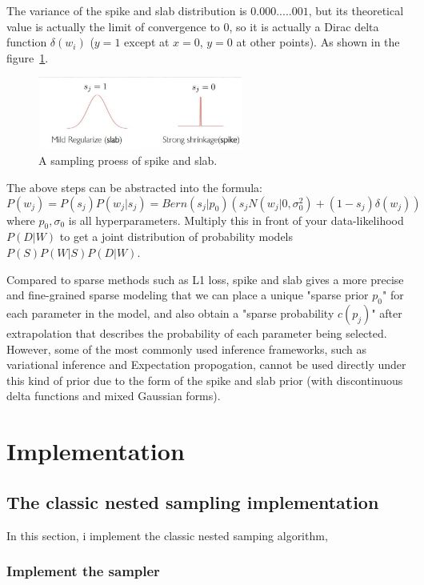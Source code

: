 \documentclass[11pt]{book}
\begin{document}
	
The variance of the spike and slab distribution is $0.000.... .001$, 
but its theoretical value is actually the limit of convergence to 0, 
so it is actually a Dirac delta function $\delta(w_i)$ ($y=1$ except at $x=0$, $y=0$ at other points).
As shown in the figure~\ref{fig:spike-slab-sampling}.
\begin{center}
	\begin{figure}[h]
			\centering
			\includegraphics[width=0.6\textwidth]{spike-slab-sampling}
			\caption{A sampling proess of spike and slab.}
			\label{fig:spike-slab-sampling}
	\end{figure}
	\end{center}

	The above steps can be abstracted into the formula:
	\begin{equation}
		P(w_j)=P(s_j)P(w_j|s_j)=Bern(s_j|p_0)(s_jN(w_j|0,\sigma_0^2) + (1-s_j)\delta (w_j))
	\end{equation}
	where $p_0,\sigma_0$ is all hyperparameters. 
	Multiply this in front of your data-likelihood $P(D|W)$ 
	to get a joint distribution of probability models $P(S)P(W|S)P(D|W)$.

	Compared to sparse methods such as L1 loss,
	spike and slab gives a more precise and fine-grained sparse modeling that 
	we can place a unique "sparse prior $p_0$" for each parameter in the model, 
	and also obtain a "sparse probability $c(p_j)$" after extrapolation that describes the probability of each parameter being selected.
	However, some of the most commonly used inference frameworks, such as variational inference and Expectation propogation, cannot be used directly under this kind of prior due to the form of the spike and slab prior (with discontinuous delta functions and mixed Gaussian forms).
	\chapter{Implementation}
\section{The classic nested sampling implementation}
In this section, i implement the classic nested samping algorithm, 
\subsection{Implement the sampler}
\end{document}
